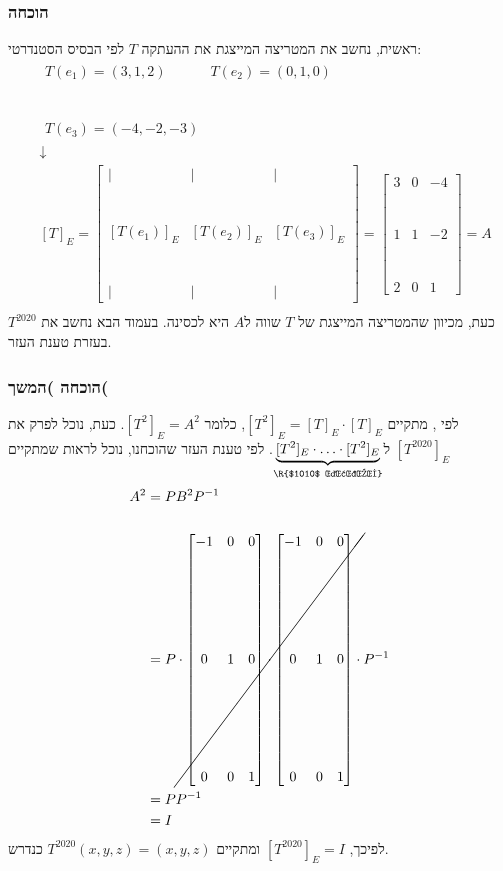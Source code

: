 \documentclass[11pt, oneside]{article}
\newcommand{\qed}{\R{$\blacksquare$}}
\newcommand{\br}{\\\\\\\\\\\\\\}
\newcommand{\m}[3]{\R{משפט #3#2.#1}}
\begin{document}
\subsubsection{הוכחה}
ראשית, נחשב את המטריצה המייצגת את ההעתקה $T$ לפי הבסיס הסטנדרטי:
\begin{eqnarray*}
& \begin{matrix}
T(e_1) = (3, 1, 2) & T(e_2) = (0, 1, 0)\br
T(e_3) = (-4, -2, -3)
\end{matrix}\\
& \downarrow\\
& [T]_E = \begin{bmatrix}
\mid & \mid & \mid\br
{[T(e_1)]_E} & {[T(e_2)]_E} & {[T(e_3)]_E}\br
\mid & \mid & \mid
\end{bmatrix} = \begin{bmatrix}
3 & 0 & -4\br
1 & 1 & -2\br
2 & 0 & 1
\end{bmatrix} = A\\
\end{eqnarray*}
כעת, מכיוון שהמטריצה המייצגת של $T$ שווה ל$A$ היא לכסינה. בעמוד הבא נחשב את $T^{2020}$ בעזרת טענת העזר.
\clearpage

\setcounter{subsubsection}{1}
\subsubsection{הוכחה )המשך(}
לפי \m{01}{4}{1.}, מתקיים $[T^2]_E = [T]_E \cdot [T]_E$, כלומר $[T^2]_E = A^2$. כעת, נוכל לפרק את $[T^{2020}]_E$ ל$\underbrace{[T^2]_E \cdot \ldots \cdot [T^2]_E}_{\text{\R{$1010$ פעמים}}}$. לפי טענת העזר שהוכחנו, נוכל לראות שמתקיים
\begin{align*}
A^2
& = PB^{2}P^{-1}\\\\
& = P \cdot \cancel{\begin{bmatrix}
-1 & 0 & 0\br
0 & 1 & 0\br
0 & 0 & 1
\end{bmatrix} \cdot \begin{bmatrix}
-1 & 0 & 0\br
0 & 1 & 0\br
0 & 0 & 1
\end{bmatrix}} \cdot P^{-1}\\
& = PP^{-1}\\
& = I
\end{align*}
לפיכך, $[T^{2020}]_E = I$ ומתקיים $T^{2020}(x, y, z) = (x, y, z)$ כנדרש.
\br\qed
\end{document}
